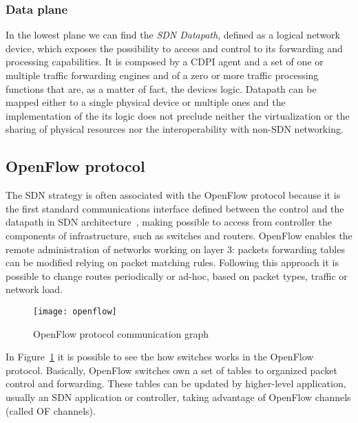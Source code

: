 \subsubsection{Data plane}
In the lowest plane we can find the \emph{SDN Datapath}, defined as a logical
network device, which exposes the possibility to access and control to its
forwarding and processing capabilities. It is composed by a CDPI agent and a set
of one or multiple traffic forwarding engines and of a zero or more traffic
processing functions that are, as a matter of fact, the devices logic. Datapath
can be mapped either to a single physical device or multiple ones and the
implementation of the its logic does not preclude neither the virtualization or
the sharing of physical resources nor the interoperability with non-SDN
networking.

\subsection{OpenFlow protocol}
The SDN strategy is often associated with the OpenFlow protocol because it is
the first standard communications interface defined between the control and the
datapath in SDN architecture~\cite{fundation2013software}, making possible to
access from controller the components of infrastructure, such as switches and
routers. OpenFlow enables the remote administration of networks working on 
layer 3: packets forwarding tables can be modified relying on packet matching 
rules. Following this approach it is possible to change routes periodically or 
ad-hoc, based on packet types, traffic or network load.

\begin{figure}[t]
 \centering
 \texttt{[image: openflow]}
 \caption{OpenFlow protocol communication graph}
 \label{chap:background:img:openflow_protocol}
\end{figure}

In Figure~\ref{chap:background:img:openflow_protocol} it is possible to see the
how switches works in the OpenFlow protocol. Basically, OpenFlow switches own a
set of tables to organized packet control and forwarding. These tables can be
updated by higher-level application, usually an SDN application or controller,
taking advantage of OpenFlow channels (called OF channels). 

